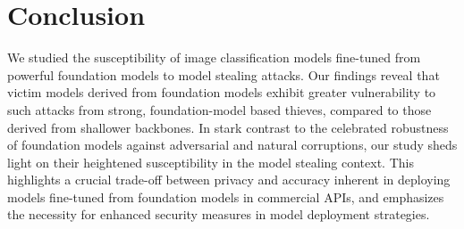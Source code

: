 
\section{Conclusion}
We studied the susceptibility of image classification models fine-tuned from powerful foundation models to model stealing attacks. Our findings reveal that victim models derived from foundation models exhibit greater vulnerability to such attacks from strong, foundation-model based thieves, compared to those derived from shallower backbones. In stark contrast to the celebrated robustness of foundation models against adversarial and natural corruptions, our study sheds light on their heightened susceptibility in the model stealing context. This highlights a crucial trade-off between privacy and accuracy inherent in deploying models fine-tuned from foundation models in commercial APIs, and emphasizes the necessity for enhanced security measures in model deployment strategies.


